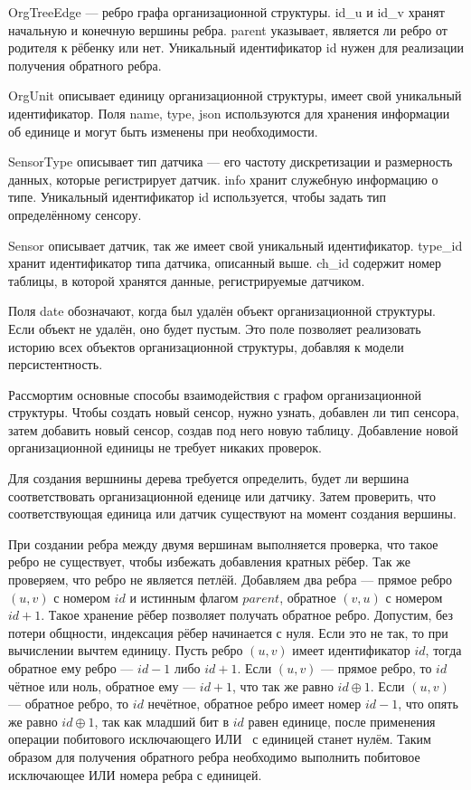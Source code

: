 OrgTreeEdge --- ребро графа организационной структуры. id\_u и id\_v хранят начальную и конечную вершины ребра. parent указывает, является ли ребро от родителя к рёбенку или нет.  Уникальный идентификатор id нужен для реализации получения обратного ребра.

OrgUnit описывает единицу организационной структуры, имеет свой уникальный идентификатор. Поля name, type, json используются для хранения информации об единице и могут быть изменены при необходимости.

SensorType описывает тип датчика --- его частоту дискретизации и размерность данных, которые регистрирует датчик. info хранит служебную информацию о типе. Уникальный идентификатор id используется, чтобы задать тип определённому сенсору.

Sensor описывает датчик, так же имеет свой уникальный идентификатор. type\_id хранит идентификатор типа датчика, описанный выше. ch\_id содержит номер таблицы, в которой хранятся данные, регистрируемые датчиком.

Поля date обозначают, когда был удалён объект организационной структуры. Если объект не удалён, оно будет пустым. Это поле позволяет реализовать историю всех объектов организационной структуры, добавляя к модели персистентность.

Рассмортим основные способы взаимодействия с графом организационной структуры. Чтобы создать новый сенсор, нужно узнать, добавлен ли тип сенсора, затем добавить новый сенсор, создав под него новую таблицу. Добавление новой организационной единицы не требует никаких проверок.

Для создания вершнины дерева требуется определить, будет ли вершина соответствовать организационной еденице или датчику. Затем проверить, что соответствующая единица или датчик существуют на момент создания вершины.

При создании ребра между двумя вершинам выполняется проверка, что такое ребро не существует, чтобы избежать добавления кратных рёбер. Так же проверяем, что ребро не является петлёй. Добавляем два ребра --- прямое ребро $(u, v)$ с номером $id$ и истинным флагом $parent$, обратное $(v, u)$ с номером $id + 1$. Такое хранение рёбер позволяет получать обратное ребро. Допустим, без потери общности, индексация рёбер начинается с нуля. Если это не так, то при вычислении вычтем единицу. Пусть ребро $(u, v)$ имеет идентификатор $id$, тогда обратное ему ребро --- $id - 1$ либо $id + 1$. Если $(u, v)$ --- прямое ребро, то $id$ чётное или ноль, обратное ему --- $id + 1$, что так же равно $id \oplus 1$. Если $(u, v)$ --- обратное ребро, то $id$ нечётное, обратное ребро имеет номер $id - 1$, что опять же равно $id \oplus 1$, так как младший бит в $id$ равен единице, после применения операции побитового исключающего ИЛИ~\cite{XOR} с единицей станет нулём. Таким образом для получения обратного ребра необходимо выполнить побитовое исключающее ИЛИ номера ребра с единицей.

